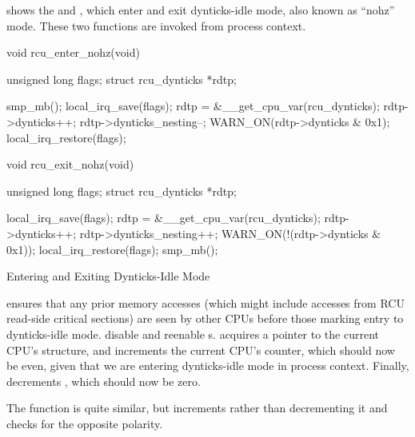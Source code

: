 shows the  and ,
which enter and exit dynticks-idle mode, also known as ``nohz'' mode.
These two functions are invoked from process context.

\begin{listing}[tbp]
\begin{fcvlabel}
\begin{VerbatimL}[commandchars=\\\[\]]
void rcu_enter_nohz(void)
{
	unsigned long flags;
	struct rcu_dynticks *rdtp;

	smp_mb();			\lnlbl[mb]
	local_irq_save(flags);		\lnlbl[irq_sv]
	rdtp = &__get_cpu_var(rcu_dynticks); 
	rdtp->dynticks++;		
	rdtp->dynticks_nesting--;	
	WARN_ON(rdtp->dynticks & 0x1);
	local_irq_restore(flags);	\lnlbl[irq_rs]
}

void rcu_exit_nohz(void)
{
	unsigned long flags;
	struct rcu_dynticks *rdtp;

	local_irq_save(flags);
	rdtp = &__get_cpu_var(rcu_dynticks);
	rdtp->dynticks++;
	rdtp->dynticks_nesting++;
	WARN_ON(!(rdtp->dynticks & 0x1));
	local_irq_restore(flags);
	smp_mb();
}
\end{VerbatimL}
\end{fcvlabel}
\caption{Entering and Exiting Dynticks-Idle Mode}
\label{lst:formal:Entering and Exiting Dynticks-Idle Mode}
\end{listing}

\begin{fcvref}
 ensures that any prior memory accesses (which might
include accesses from RCU read-side critical sections) are seen
by other CPUs before those marking entry to dynticks-idle mode.
 disable and reenable \IRQ s.
 acquires a pointer to the current CPU's 
structure, and
 increments the current CPU's  counter, which
should now be even, given that we are entering dynticks-idle mode
in process context.
Finally,  decrements ,
which should now be zero.
\end{fcvref}

The  function is quite similar, but increments
 rather than decrementing it and checks for
the opposite  polarity.

